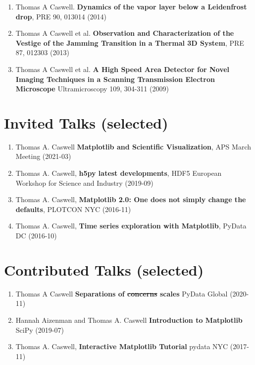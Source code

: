 \documentclass[margin]{res} %
\begin{document}
\begin{resume}
\begin{enumerate}
  \item Thomas A Caswell. \textbf{Dynamics of the vapor layer below a
    Leidenfrost drop}, PRE 90, 013014 (2014)

  \item Thomas A Caswell et al. \textbf{Observation and
    Characterization of the Vestige of the Jamming Transition in a
    Thermal 3D System}, PRE 87, 012303 (2013)

  \item Thomas A Caswell et al. \textbf{A High Speed Area
    Detector for Novel Imaging Techniques in a Scanning Transmission
    Electron Microscope} Ultramicroscopy 109, 304-311 (2009)

\end{enumerate}

\section{Invited Talks (selected)}
\begin{enumerate}
    \setlength{\itemsep}{-1pt}
\item Thomas A. Caswell \textbf{Matplotlib and Scientific Visualization},
  APS March Meeting (2021-03)
\item Thomas A. Caswell, \textbf{h5py latest developments}, HDF5
  European Workshop for Science and Industry (2019-09)
\item Thomas A. Caswell, \textbf{Matplotlib 2.0: One does not simply
  change the defaults}, PLOTCON NYC (2016-11)
\item Thomas A. Caswell, \textbf{Time series exploration with
  Matplotlib}, PyData DC (2016-10)

\end{enumerate}




\section{Contributed Talks (selected)}

\begin{enumerate}
    \setlength{\itemsep}{-1pt}
\item Thomas A Caswell \textbf{Separations of \sout{concerns} scales} PyData
  Global (2020-11)
\item Hannah Aizenman and Thomas A. Caswell \textbf{Introduction to
  Matplotlib} SciPy (2019-07)
\item Thomas A. Caswell, \textbf{Interactive Matplotlib Tutorial}
  pydata NYC (2017-11)
\end{enumerate}




\end{resume}
\end{document}
